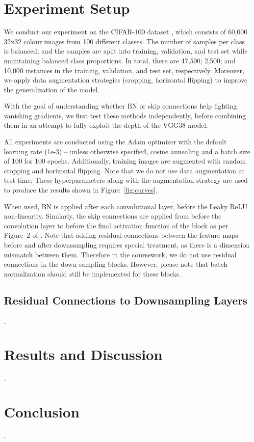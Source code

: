 \documentclass{article}
\begin{document}
\section{Experiment Setup}

\questionFigureFour

\questionFigureFive

\questionTableOne

We conduct our experiment on the CIFAR-100 dataset \cite{krizhevsky2009learning},
which consists of 60,000 32x32 colour images from
100 different classes. The number of samples per class is balanced, and the
samples are split into training, validation, and test set while
maintaining balanced class proportions. In total, there are
47,500; 2,500; and 10,000 instances in the training, validation,
and test set, respectively. Moreover, we apply data
augmentation strategies (cropping, horizontal flipping) to
improve the generalization of the model.

With the goal of understanding whether BN or skip connections
help fighting vanishing gradients, we first test these
methods independently, before combining them in an attempt
to fully exploit the depth of the VGG38 model.

All experiments are conducted using the Adam optimizer with the default
learning rate (1e-3) -- unless otherwise specified, cosine annealing and a batch size of 100
for 100 epochs. 
Additionally, training images are augmented with random 
cropping and horizontal flipping.
Note that we do not use data augmentation at test time.
These hyperparameters along with the augmentation strategy are used
to produce the results shown in Figure~\ref{fig:curves}.

When used, BN is applied
after each convolutional layer, before the Leaky
ReLU non-linearity. 
Similarly, the skip connections are applied from 
before the convolution layer to before the final activation function
of the block as per Figure~2 of \cite{he2016deep}. 
Note that adding residual connections between the feature maps before and after downsampling requires special treatment, as there is a dimension mismatch between them. 
Therefore in the coursework, we do not use residual connections in the down-sampling blocks. However, please note that batch normalization should still be implemented for these blocks. 

\subsection{Residual Connections to Downsampling Layers}
\label{subsec:rescimp}

\questionFour.


\section{Results and Discussion}
\label{sec:disc}

\questionFive.

\section{Conclusion}
\label{sec:concl}
    
\questionSix.


\end{document}
